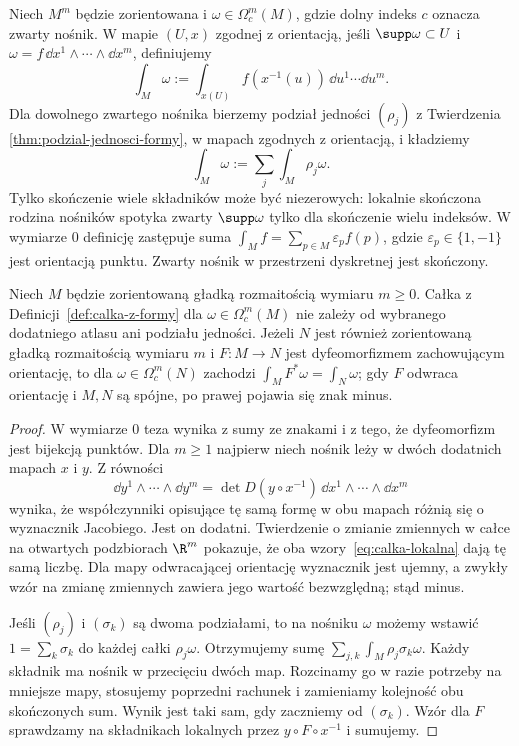 \begin{definicja}
\label{def:calka-z-formy}
Niech $M^m$ będzie zorientowana i
$\omega\in\Omega_c^m(M)$, gdzie dolny indeks $c$
oznacza zwarty nośnik. W mapie $(U,x)$ zgodnej z
orientacją, jeśli $\supp\omega\subset U$ i
$\omega=f\,\dd x^1\wedge\cdots\wedge\dd x^m$,
definiujemy
\begin{equation}\label{eq:calka-lokalna}
 \int_M\omega:=\int_{x(U)} f(x^{-1}(u))\,\dd u^1\cdots\dd u^m.
\end{equation}
Dla dowolnego zwartego nośnika bierzemy podział
jedności $(\rho_j)$ z Twierdzenia
\ref{thm:podzial-jednosci-formy}, w mapach zgodnych
z orientacją, i kładziemy
\begin{equation}\label{eq:calka-globalna}
 \int_M\omega:=\sum_j\int_M\rho_j\omega.
\end{equation}
Tylko skończenie wiele składników może być niezerowych:
lokalnie skończona rodzina nośników spotyka zwarty
$\supp\omega$ tylko dla skończenie wielu indeksów.
W wymiarze $0$ definicję zastępuje suma
$\int_M f=\sum_{p\in M}\varepsilon_p f(p)$,
gdzie $\varepsilon_p\in\{1,-1\}$ jest orientacją punktu.
Zwarty nośnik w przestrzeni dyskretnej jest skończony.
\end{definicja}

\begin{twierdzenie}
\label{thm:calka-dobrze-okreslona}
Niech $M$ będzie zorientowaną gładką rozmaitością
wymiaru $m\geq0$.
Całka z Definicji~\ref{def:calka-z-formy} dla
$\omega\in\Omega_c^m(M)$ nie zależy od
wybranego dodatniego atlasu ani podziału jedności.
Jeżeli $N$ jest również zorientowaną gładką rozmaitością
wymiaru $m$ i $F:M\to N$ jest dyfeomorfizmem zachowującym
orientację, to dla $\omega\in\Omega_c^m(N)$ zachodzi
$\int_M F^*\omega=\int_N\omega$; gdy $F$ odwraca
orientację i $M,N$ są spójne, po prawej pojawia się
znak minus.
\end{twierdzenie}
\begin{proof}
W wymiarze $0$ teza wynika z sumy ze znakami i z tego,
że dyfeomorfizm jest bijekcją punktów. Dla $m\geq1$
najpierw niech nośnik leży w dwóch dodatnich mapach
$x$ i $y$. Z równości
\[
 \dd y^1\wedge\cdots\wedge\dd y^m
 =\det D(y\circ x^{-1})\,
   \dd x^1\wedge\cdots\wedge\dd x^m
\]
wynika, że współczynniki opisujące tę samą formę
w obu mapach różnią się o wyznacznik Jacobiego.
Jest on dodatni. Twierdzenie o zmianie zmiennych
w całce na otwartych podzbiorach $\R^m$ pokazuje,
że oba wzory~\eqref{eq:calka-lokalna} dają tę samą
liczbę. Dla mapy odwracającej orientację wyznacznik
jest ujemny, a zwykły wzór na zmianę zmiennych
zawiera jego wartość bezwzględną; stąd minus.

Jeśli $(\rho_j)$ i $(\sigma_k)$ są dwoma podziałami,
to na nośniku $\omega$ możemy wstawić
$1=\sum_k\sigma_k$ do każdej całki $\rho_j\omega$.
Otrzymujemy sumę $\sum_{j,k}\int_M\rho_j\sigma_k\omega$.
Każdy składnik ma nośnik w przecięciu dwóch map.
Rozcinamy go w razie potrzeby na mniejsze mapy,
stosujemy poprzedni rachunek i zamieniamy kolejność
obu skończonych sum. Wynik jest taki sam, gdy
zaczniemy od $(\sigma_k)$. Wzór dla $F$ sprawdzamy
na składnikach lokalnych przez $y\circ F\circ x^{-1}$
i sumujemy.
\end{proof}

